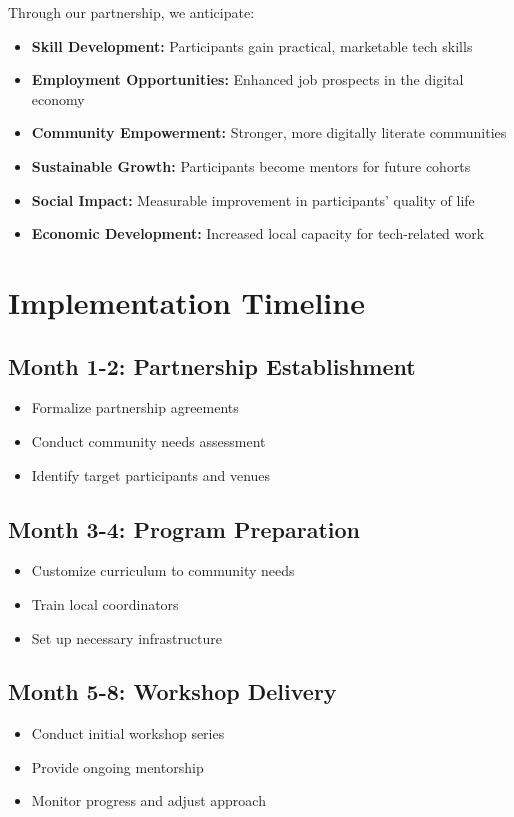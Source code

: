 \documentclass[12pt,a4paper]{article}
\begin{document}
Through our partnership, we anticipate:

\begin{itemize}[leftmargin=*]
    \item \textbf{Skill Development:} Participants gain practical, marketable tech skills
    \item \textbf{Employment Opportunities:} Enhanced job prospects in the digital economy
    \item \textbf{Community Empowerment:} Stronger, more digitally literate communities
    \item \textbf{Sustainable Growth:} Participants become mentors for future cohorts
    \item \textbf{Social Impact:} Measurable improvement in participants' quality of life
    \item \textbf{Economic Development:} Increased local capacity for tech-related work
\end{itemize}

\section{Implementation Timeline}

\subsection{Month 1-2: Partnership Establishment}
\begin{itemize}[leftmargin=*]
    \item Formalize partnership agreements
    \item Conduct community needs assessment
    \item Identify target participants and venues
\end{itemize}

\subsection{Month 3-4: Program Preparation}
\begin{itemize}[leftmargin=*]
    \item Customize curriculum to community needs
    \item Train local coordinators
    \item Set up necessary infrastructure
\end{itemize}

\subsection{Month 5-8: Workshop Delivery}
\begin{itemize}[leftmargin=*]
    \item Conduct initial workshop series
    \item Provide ongoing mentorship
    \item Monitor progress and adjust approach
\end{itemize}
\end{document}
